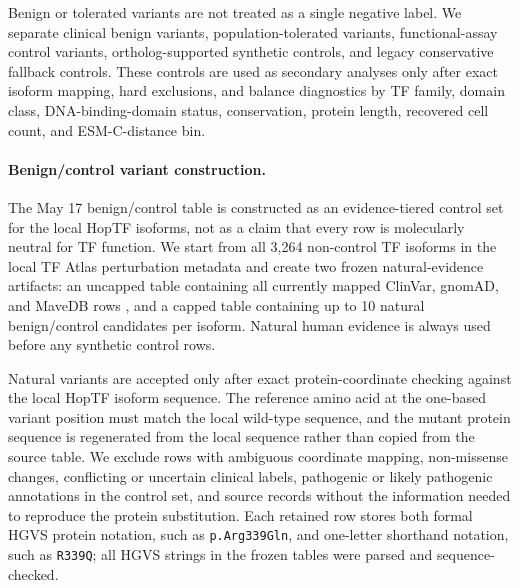 \documentclass[11pt]{article}
\begin{document}
Benign or tolerated variants are not treated as a single negative label. We separate clinical benign variants, population-tolerated variants, functional-assay control variants, ortholog-supported synthetic controls, and legacy conservative fallback controls. These controls are used as secondary analyses only after exact isoform mapping, hard exclusions, and balance diagnostics by TF family, domain class, DNA-binding-domain status, conservation, protein length, recovered cell count, and ESM-C-distance bin.

\paragraph{Benign/control variant construction.}
The May 17 benign/control table is constructed as an evidence-tiered control set for the local HopTF isoforms, not as a claim that every row is molecularly neutral for TF function. We start from all 3,264 non-control TF isoforms in the local TF Atlas perturbation metadata and create two frozen natural-evidence artifacts: an uncapped table containing all currently mapped ClinVar, gnomAD, and MaveDB rows \citep{landrum2025clinvar,karczewski2020gnomad,esposito2019mavedb}, and a capped table containing up to 10 natural benign/control candidates per isoform. Natural human evidence is always used before any synthetic control rows.

Natural variants are accepted only after exact protein-coordinate checking against the local HopTF isoform sequence. The reference amino acid at the one-based variant position must match the local wild-type sequence, and the mutant protein sequence is regenerated from the local sequence rather than copied from the source table. We exclude rows with ambiguous coordinate mapping, non-missense changes, conflicting or uncertain clinical labels, pathogenic or likely pathogenic annotations in the control set, and source records without the information needed to reproduce the protein substitution. Each retained row stores both formal HGVS protein notation, such as \texttt{p.Arg339Gln}, and one-letter shorthand notation, such as \texttt{R339Q}; all HGVS strings in the frozen tables were parsed and sequence-checked.
\end{document}
